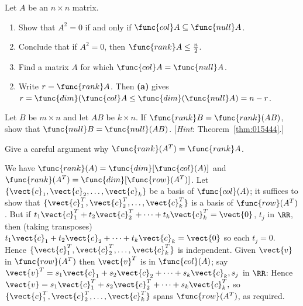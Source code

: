 \begin{multicols}{2}
\begin{ex}
Let $A$ be an $n \times n$ matrix.

\begin{enumerate}[label={\alph*.}]
\item Show that $A^{2} = 0$ if and only if $\func{col} A \subseteq \func{null} A$.

\item Conclude that if $A^{2} = 0$, then $\func{rank} A \leq \frac{n}{2}$.

\item Find a matrix $A$ for which $\func{col} A = \func{null} A$.

\end{enumerate}
\begin{sol}
\begin{enumerate}[label={\alph*.}]
\setcounter{enumi}{1}
\item  Write $r = \func{rank} A$. Then \textbf{(a)} gives $r = \func{dim}(\func{col} A \leq \func{dim}(\func{null} A) = n - r$.

\end{enumerate}
\end{sol}
\end{ex}

\begin{ex}
Let $B$ be $m \times n$ and let $AB$ be $k \times n$. If $\func{rank} B = \func{rank}(AB)$, show that $\func{null} B = \func{null}(AB)$. [\textit{Hint}: Theorem~\ref{thm:015444}.]
\end{ex}

\begin{ex}
	\label{ex:5_4_12}
Give a careful argument why $\func{rank}(A^{T}) = \func{rank} A$.

\begin{sol}
We have $\func{rank}(A) = \func{dim}[\func{col}(A)]$ and $\func{rank}(A^T) = \func{dim}[\func{row}(A^T)]$. Let $\{\vect{c}_1, \vect{c}_2, \dots, \vect{c}_k\}$ be a basis of $\func{col}(A)$; it suffices to show that $\{\vect{c}_1^T, \vect{c}_2^T, \dots, \vect{c}_k^T\}$ is a basis of $\func{row}(A^T)$. But if $t_1\vect{c}_1^T + t_2\vect{c}_2^T + \dots + t_k\vect{c}_k^T = \vect{0}$, $t_j$ in $\RR$, then (taking transposes) $t_1\vect{c}_1 + t_2\vect{c}_2 + \dots + t_k\vect{c}_k = \vect{0}$ so each $t_j = 0$. Hence $\{\vect{c}_1^T, \vect{c}_2^T, \dots, \vect{c}_k^T\}$ is independent. Given $\vect{v}$ in $\func{row}(A^T)$ then $\vect{v}^T$ is in $\func{col}(A)$; say $\vect{v}^T = s_1\vect{c}_1 + s_2\vect{c}_2 + \dots + s_k\vect{c}_k, s_j $ in $\RR$:
Hence $\vect{v} = s_1\vect{c}_1^T + s_2\vect{c}_2^T + \dots + s_k\vect{c}_k^T,$ so $\{\vect{c}_1^T, \vect{c}_2^T, \dots, \vect{c}_k^T \}$ spans $\func{row}(A^T)$, as required.
\end{sol}
\end{ex}


\end{multicols}
